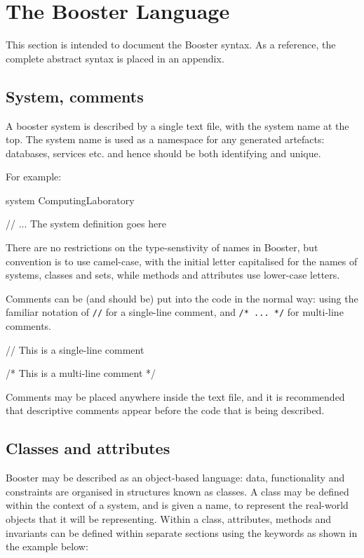 \chapter{The Booster Language}


This section is intended to document the Booster syntax.  As a
reference, the complete abstract syntax is placed in an appendix.

\section{System, comments}
A booster system is described by a single text file, with the system
name at the top.  The system name is used as a namespace for any
generated artefacts: databases, services etc. and hence should be both
identifying and unique.

For example:

\begin{code}
system ComputingLaboratory

// ... The system definition goes here
\end{code}

There are no restrictions on the type-senstivity of names in
Booster, but convention is to use camel-case, with the initial letter
capitalised for the names of systems, classes and sets, while methods
and attributes use lower-case letters.

Comments can be (and should be) put into the code in the normal way:
using the familiar notation of \verb|//| for a single-line comment,
and \verb|/* ... */| for multi-line comments.

\begin{code}
// This is a single-line comment

/* This is a multi-line 
comment */
\end{code}

Comments may be placed anywhere inside the text file, and it is
recommended that descriptive comments appear before the code that is
being described.


\section{Classes and attributes}

Booster may be described as an object-based language: data,
functionality and constraints are organised in structures known as
classes.  A class may be defined within the context of a system, and
is given a name, to represent the real-world objects that it will be
representing.  Within a class, attributes, methods and invariants can
be defined within separate sections using the keywords as shown in the
example below:


